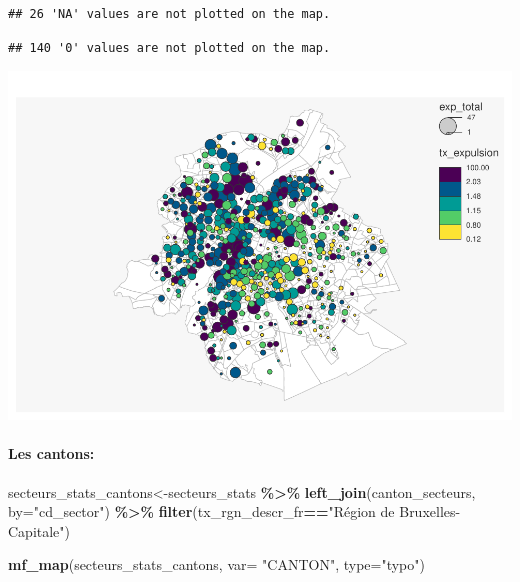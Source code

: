 \documentclass[
]{book}
\newenvironment{Shaded}{\begin{snugshade}}{\end{snugshade}}
\newcommand{\AttributeTok}[1]{\textcolor[rgb]{0.13,0.29,0.53}{#1}}
\newcommand{\FunctionTok}[1]{\textcolor[rgb]{0.13,0.29,0.53}{\textbf{#1}}}
\newcommand{\NormalTok}[1]{#1}
\newcommand{\OtherTok}[1]{\textcolor[rgb]{0.56,0.35,0.01}{#1}}
\newcommand{\SpecialCharTok}[1]{\textcolor[rgb]{0.81,0.36,0.00}{\textbf{#1}}}
\newcommand{\StringTok}[1]{\textcolor[rgb]{0.31,0.60,0.02}{#1}}
\begin{document}
\begin{verbatim}
## 26 'NA' values are not plotted on the map.
\end{verbatim}

\begin{verbatim}
## 140 '0' values are not plotted on the map.
\end{verbatim}

\includegraphics{bookdown-demo_files/figure-latex/unnamed-chunk-33-1.pdf}

\hypertarget{les-cantons}{%
\paragraph{Les cantons:}\label{les-cantons}}

\begin{Shaded}
\begin{Highlighting}[]
\NormalTok{secteurs\_stats\_cantons}\OtherTok{\textless{}{-}}\NormalTok{secteurs\_stats }\SpecialCharTok{\%\textgreater{}\%}
  \FunctionTok{left\_join}\NormalTok{(canton\_secteurs, }\AttributeTok{by=}\StringTok{"cd\_sector"}\NormalTok{) }\SpecialCharTok{\%\textgreater{}\%}
  \FunctionTok{filter}\NormalTok{(tx\_rgn\_descr\_fr}\SpecialCharTok{==}\StringTok{"Région de Bruxelles{-}Capitale"}\NormalTok{)}

\FunctionTok{mf\_map}\NormalTok{(secteurs\_stats\_cantons,}
       \AttributeTok{var=} \StringTok{"CANTON"}\NormalTok{,}
       \AttributeTok{type=}\StringTok{"typo"}\NormalTok{)}
\end{Highlighting}
\end{Shaded}
\end{document}

